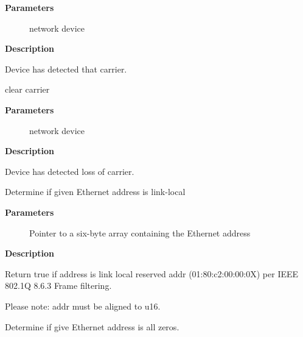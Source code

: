 \documentclass[a4paper,8pt,english]{sphinxmanual}
\begin{document}
\textbf{Parameters}
\begin{description}
\item[{}] \leavevmode
network device

\end{description}

\textbf{Description}

Device has detected that carrier.

\begin{fulllineitems}
\label{networking/kapi:c.netif_carrier_off}
clear carrier

\end{fulllineitems}


\textbf{Parameters}
\begin{description}
\item[{}] \leavevmode
network device

\end{description}

\textbf{Description}

Device has detected loss of carrier.

\begin{fulllineitems}
\label{networking/kapi:c.is_link_local_ether_addr}
Determine if given Ethernet address is link-local

\end{fulllineitems}


\textbf{Parameters}
\begin{description}
\item[{}] \leavevmode
Pointer to a six-byte array containing the Ethernet address

\end{description}

\textbf{Description}

Return true if address is link local reserved addr (01:80:c2:00:00:0X) per
IEEE 802.1Q 8.6.3 Frame filtering.

Please note: addr must be aligned to u16.

\begin{fulllineitems}
\label{networking/kapi:c.is_zero_ether_addr}
Determine if give Ethernet address is all zeros.

\end{fulllineitems}
\end{document}

